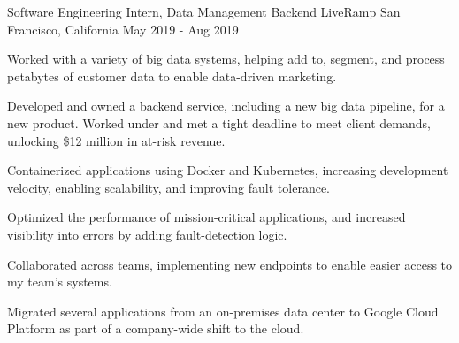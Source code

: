 

\begin{cventries}

    \cventry
      {Software Engineering Intern, Data Management Backend}
      {LiveRamp}
      {San Francisco, California}
      {May 2019 - Aug 2019}
      {
        \begin{cvitems}
          \item Worked with a variety of big data systems, helping add to, segment, and process petabytes of customer data to enable data-driven marketing.
          \item Developed and owned a backend service, including a new big data pipeline, for a new product. Worked under and met a tight deadline to meet client demands, unlocking \$12 million in at-risk revenue.
          \item Containerized applications using Docker and Kubernetes, increasing development velocity, enabling scalability, and improving fault tolerance.         
          \item Optimized the performance of mission-critical applications, and increased visibility into errors by adding fault-detection logic.
          \item Collaborated across teams, implementing new endpoints to enable easier access to my team's systems.
          \item Migrated several applications from an on-premises data center to Google Cloud Platform as part of a company-wide shift to the cloud.
        \end{cvitems}
      }


\end{cventries}
